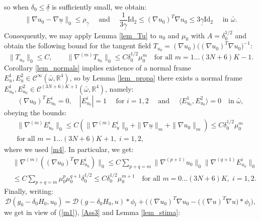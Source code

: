 \documentclass[reqno,twoside,11pt]{amsart}
\newcommand{\Id}{\mathrm{Id}}
\newcommand{\R}{\mathbb{R}}
\numberwithin{equation}{section}
\theoremstyle{plain}
\theoremstyle{definition}
\begin{document}
so when $\delta_0\leq \underline \delta$ is sufficiently small, we obtain:
\begin{equation}\label{m5}
\|\nabla u_0-\nabla \underline u\|_0\leq \rho_{\underline\gamma}
\quad \mbox{ and } \quad \frac{1}{3\underline \gamma}\Id_2\leq (\nabla u_0)^T\nabla u_0\leq
3\underline\gamma\Id_2 \quad\mbox{ in }\bar\omega.
\end{equation}
Consequently, we may apply Lemma \ref{lem_Tu} to $u_0$ and $\mu_0$
with $A=\delta_0^{1/2}$ and obtain the following bound for the tangent
field $T_{u_0}=(\nabla u_0)\big((\nabla u_0)^T\nabla u_0\big)^{-1}$:
\begin{equation}\label{m6}
\|T_{u_0}\|_0\leq C, \qquad \|\nabla^{(m)}T_{u_0}\|_0\leq
C \delta_0^{1/2} \mu_0^m \quad\mbox{for all } m=1\ldots (3N+6)K -1.
\end{equation}
Corollary \ref{lem_normals} implies existence of a normal frame
$E_{\underline u}^1, E_{\underline u}^2\in \mathcal{C}^{\infty}(\bar\omega,\R^4)$, 
so by Lemma \ref{lem_propa} there exists a normal frame 
$E_{u_0}^1, E_{u_0}^2\in \mathcal{C}^{(3N+6)K+1}(\bar\omega,\R^4)$, namely:
$$(\nabla u_0)^TE_{u_0}^i=0,\quad |E_{u_0}^i|=1 \quad \mbox{ for }
i=1,2 \quad\mbox{ and } \quad \langle E_{u_0}^1,E_{u_0}^2\rangle =
0\quad\mbox{in }\bar\omega,$$
obeying the bounds:
\begin{equation}\label{m7}
\begin{split}
& \|\nabla^{(m)}E^i_{u_0}\|_0\leq C(\|\nabla^{(m)}E^i_{\underline u}\|_0+
\|\nabla \underline u\|_m + \|\nabla u_0\|_m) \leq 
C\delta_0^{1/2}\mu_0^m\quad\\ & \mbox{for all } m=1\ldots (3N+6)K+1, \; i=1,2,
\end{split}
\end{equation}
where we used \ref{m4}. In particular, we get:
\begin{equation}\label{m8}
\begin{split}
& \|\nabla^{(m)}((\nabla u_0)^T\nabla E^i_{u_0})\|_0 \leq
C\sum_{p+q=m}\|\nabla^{(p+1)}u_0\|_0 \|\nabla^{(q+1)}E_{u_0}^i\|_0\\ &
\leq C \sum_{p+q=m} \mu_0^{p}\mu_0^{q+1}\delta_0^{1/2}
\leq C \delta_0^{1/2} \mu_0^{m+1}\quad\mbox{for all }m=0\ldots (3N+6)K,\; i=1,2.
\end{split}
\end{equation}
Finally, writing:
$$\mathcal{D}(g_0-\delta_0H_0,u_0) = \mathcal{D}(g-\delta_0H_0,u)\ast\phi_l
+ \Big((\nabla u_0)^T\nabla u_0 - \big((\nabla u)^T\nabla u\big)\ast
\phi_l\Big),$$
we get in view of (\ref{m1}), \ref{Ass3} and Lemma \ref{lem_stima}:
\end{document}
